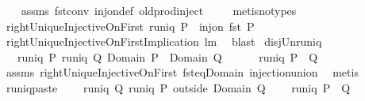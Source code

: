 \begin{isabellebody}
\ \ \isamarkupfalse%
\ assms\ fst{\isacharunderscore}conv\ inj{\isacharunderscore}on{\isacharunderscore}def\ old{\isachardot}prod{\isachardot}inject\ \isanewline
\ \ \isamarkupfalse%
\ {\isacharparenleft}metis{\isacharparenleft}no{\isacharunderscore}types{\isacharparenright}{\isacharparenright}%
\endisatagproof
{\isafoldproof}%
%
\isadelimproof
\isanewline
%
\endisadelimproof
\isanewline
\isanewline
{}\isamarkupfalse%
\ rightUniqueInjectiveOnFirst{\isacharcolon}\ {\isachardoublequoteopen}{\isacharparenleft}runiq\ P{\isacharparenright}\ {\isacharequal}\ {\isacharparenleft}inj{\isacharunderscore}on\ fst\ P{\isacharparenright}{\isachardoublequoteclose}\ \isanewline
%
\isadelimproof
\ \ %
\endisadelimproof
%
\isatagproof
{}\isamarkupfalse%
\ rightUniqueInjectiveOnFirstImplication\ lm{}{}\ \isamarkupfalse%
\ blast%
\endisatagproof
{\isafoldproof}%
%
\isadelimproof
\isanewline
%
\endisadelimproof
\isanewline
{}\isamarkupfalse%
\ disj{\isacharunderscore}Un{\isacharunderscore}runiq{\isacharcolon}\ \isanewline
\ \ \ {\isachardoublequoteopen}runiq\ P{\isachardoublequoteclose}\ {\isachardoublequoteopen}runiq\ Q{\isachardoublequoteclose}\ {\isachardoublequoteopen}{\isacharparenleft}Domain\ P{\isacharparenright}\ {\isasyminter}\ {\isacharparenleft}Domain\ Q{\isacharparenright}\ {\isacharequal}\ {\isacharbraceleft}{\isacharbraceright}{\isachardoublequoteclose}\ \isanewline
\ \ \ {\isachardoublequoteopen}runiq\ {\isacharparenleft}P\ {\isasymunion}\ Q{\isacharparenright}{\isachardoublequoteclose}\ \isanewline
%
\isadelimproof
\ \ %
\endisadelimproof
%
\isatagproof
{}\isamarkupfalse%
\ assms\ rightUniqueInjectiveOnFirst\ fst{\isacharunderscore}eq{\isacharunderscore}Domain\ injection{\isacharunderscore}union\ \isamarkupfalse%
\ metis%
\endisatagproof
{\isafoldproof}%
%
\isadelimproof
\isanewline
%
\endisadelimproof
\isanewline
{}\isamarkupfalse%
\ runiq{\isacharunderscore}paste{}{\isacharcolon}\ \isanewline
\ \ \ {\isachardoublequoteopen}runiq\ Q{\isachardoublequoteclose}\ {\isachardoublequoteopen}runiq\ {\isacharparenleft}P\ outside\ Domain\ Q{\isacharparenright}{\isachardoublequoteclose}\ \isanewline
\ \ \ {\isachardoublequoteopen}runiq\ {\isacharparenleft}P\ {\isacharplus}{\isacharasterisk}\ Q{\isacharparenright}{\isachardoublequoteclose}\isanewline
%
\isadelimproof
\ \ %
\endisadelimproof
%
\isatagproof
{}\isamarkupfalse%

\end{isabellebody}
